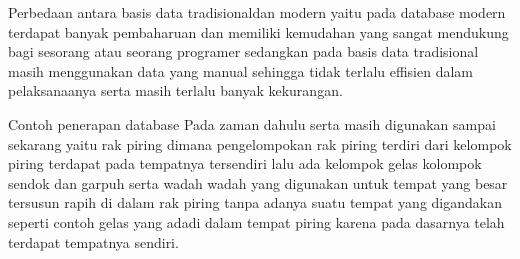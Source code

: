 \documentclass[12pt]{article}
\begin{document}
Perbedaan antara basis data tradisionaldan modern yaitu pada database modern terdapat banyak pembaharuan dan memiliki kemudahan yang sangat mendukung bagi sesorang atau seorang programer sedangkan pada basis data tradisional masih menggunakan data yang manual sehingga tidak terlalu effisien dalam pelaksanaanya serta masih terlalu banyak kekurangan. 

Contoh penerapan database 
Pada zaman dahulu serta masih digunakan sampai sekarang yaitu rak piring dimana pengelompokan rak piring terdiri dari kelompok piring terdapat pada tempatnya tersendiri lalu ada kelompok gelas kolompok sendok dan garpuh serta wadah wadah yang digunakan untuk tempat yang besar tersusun rapih di dalam rak piring tanpa adanya suatu tempat yang digandakan seperti contoh gelas yang adadi dalam tempat piring karena pada dasarnya telah terdapat tempatnya sendiri.
\end{document}
